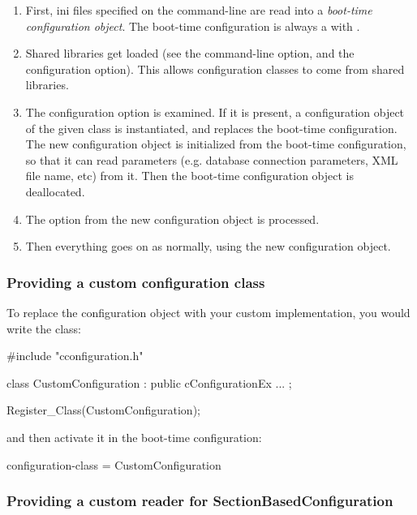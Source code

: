 \begin{enumerate}
  \item First, ini files specified on the command-line are read into a
     \textit{boot-time configuration object}. The boot-time configuration
     is always a  with
     .
  \item Shared libraries get loaded (see the  command-line option,
     and the  configuration option). This allows
     configuration classes to come from shared libraries.
  \item The  configuration option is examined.
     If it is present, a configuration object of the given class
     is instantiated, and replaces the boot-time configuration.
     The new configuration object is initialized from the boot-time
     configuration, so that it can read parameters (e.g. database
     connection parameters, XML file name, etc) from it.
     Then the boot-time configuration object is deallocated.
  \item The  option from the new configuration object is
     processed.
  \item Then everything goes on as normally, using the new configuration
     object.
\end{enumerate}

\subsubsection{Providing a custom configuration class}

To replace the configuration object with your custom implementation,
you would write the class:

\begin{cpp}
#include "cconfiguration.h"

class CustomConfiguration : public cConfigurationEx
{
   ...
};

Register_Class(CustomConfiguration);
\end{cpp}

and then activate it in the boot-time configuration:

\begin{inifile}
[General]
configuration-class = CustomConfiguration
\end{inifile}


\subsubsection{Providing a custom reader for SectionBasedConfiguration}

